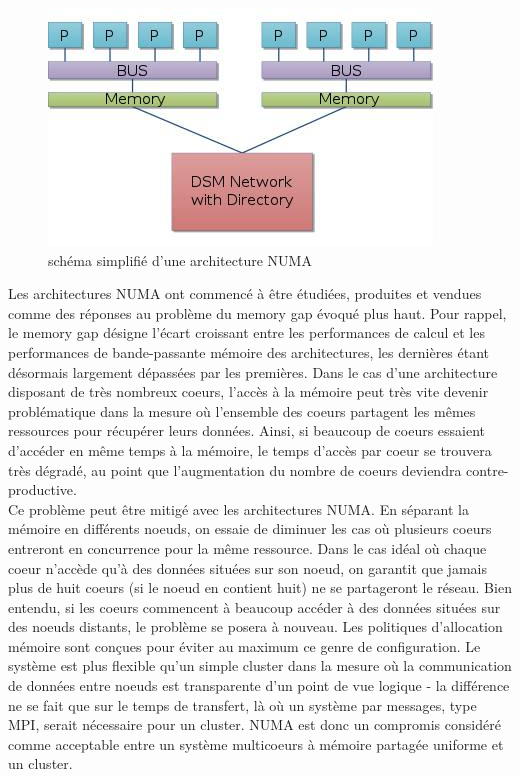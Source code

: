 \documentclass{report}
\begin{document}
\begin{figure}
  \includegraphics[width=\linewidth]{NUMA.jpg}
  \caption{schéma simplifié d'une architecture NUMA}
  \label{fig:NUMA1}
\end{figure}

Les architectures NUMA ont commencé à être étudiées, produites et vendues comme des réponses au problème
du memory gap évoqué plus haut. Pour rappel, le memory gap désigne l'écart croissant entre les performances
de calcul et les performances de bande-passante mémoire des architectures, les dernières étant désormais 
largement dépassées par les premières. Dans le cas d'une architecture disposant de très nombreux coeurs,
l'accès à la mémoire peut très vite devenir problématique dans la mesure où l'ensemble des coeurs partagent
les mêmes ressources pour récupérer leurs données. Ainsi, si beaucoup de coeurs essaient d'accéder en
même temps à la mémoire, le temps d'accès par coeur se trouvera très dégradé, au point que l'augmentation
du nombre de coeurs deviendra contre-productive. 
\\Ce problème peut être mitigé avec les architectures NUMA. En séparant la mémoire en différents noeuds,
on essaie de diminuer les cas où plusieurs coeurs entreront en concurrence pour la même ressource. Dans
le cas idéal où chaque coeur n'accède qu'à des données situées sur son noeud, on garantit que jamais
plus de huit coeurs (si le noeud en contient huit) ne se partageront le réseau. Bien entendu, si les
coeurs commencent à beaucoup accéder à des données situées sur des noeuds distants, le problème se posera
à nouveau. Les politiques d'allocation mémoire sont conçues pour éviter au maximum ce genre de configuration.
Le système est plus flexible qu'un simple cluster dans la mesure où la communication de données entre noeuds
est transparente d'un point de vue logique - la différence ne se fait que sur le temps de transfert, là
où un système par messages, type MPI,  serait nécessaire pour un cluster. NUMA est donc un compromis 
considéré comme acceptable entre un système multicoeurs à mémoire partagée uniforme et un cluster.
\end{document}
